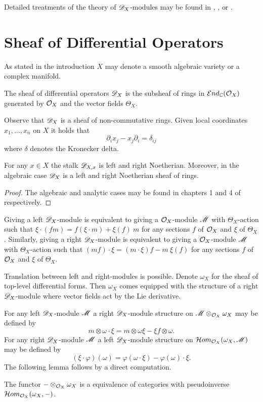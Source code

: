 Detailed treatments of the theory of $\mathscr{D}_X$-modules may be found in  \cite{bjork1979rings}, \cite{kashiwara2003d}, \cite{hotta2007d} or \cite{borel1987algebraic}.
\section{Sheaf of Differential Operators}
As stated in the introduction $X$ may denote a smooth algebraic variety or a complex manifold.
\begin{definition}
  The sheaf of differential operators $\mathscr{D}_X$ is the subsheaf of rings in $\mathcal{E}nd_{\mathbb{C}}(\mathcal{O}_X)$ generated by $\mathcal{O}_X$ and the vector fields $\Theta_X$.
\end{definition}
Observe that $\mathscr{D}_X$ is a sheaf of non-commutative rings.
Given local coordinates $x_1,\ldots, x_n$ on $X$ it holds that
$$\partial_i x_j - x_j\partial_i = \delta_{ij} $$
where $\delta$ denotes the Kronecker delta.
\begin{lemma}
  For any $x\in X$ the stalk $\mathscr{D}_{X,x}$ is left and right Noetherian. Moreover, in the algebraic case $\mathscr{D}_X$ is a left and right Noetherian sheaf of rings.
\end{lemma}
\begin{proof}
  The algebraic and analytic cases may be found in chapters 1 and 4 of \cite{hotta2007d} respectively.
\end{proof}
Giving a left $\mathscr{D}_X$-module is equivalent to giving a $\mathcal{O}_X$-module $\mathscr{M}$ with $\Theta_X$-action such that
$\xi\cdot (fm) = f (\xi \cdot m)  + \xi(f)\ m  $
for any sections $f$ of $\mathcal{O}_X$ and $\xi$ of $\Theta_X$. Similarly, giving a right $\mathscr{D}_X$-module is equivalent to giving a $\mathcal{O}_X$-module $\mathscr{M}$ with $\Theta_X$-action such that
$(mf)\cdot\xi = (m\cdot\xi)f - m\ \xi(f) $ for any sections $f$ of $\mathcal{O}_X$ and $\xi$ of $\Theta_X$.

Translation between left and right-modules is possible.
Denote $\omega_X$ for the sheaf of top-level differential forms.
Then $\omega_X$ comes equipped with the structure of a right $\mathscr{D}_X$-module where vector fields act by the Lie derivative.

For any left $\mathscr{D}_X$-module $\mathscr{M}$ a right $\mathscr{D}_X$-module structure on $\mathscr{M}\otimes_{\mathcal{O}_X}\omega_X$ may be defined by
$$m\otimes \omega \cdot \xi = m\otimes \omega\xi - \xi f \otimes \omega.$$
For any right $\mathscr{D}_X$-module $\mathscr{M}$ a left $\mathscr{D}_X$-module structure on $\mathcal{H}om_{\mathcal{O}_X}(\omega_X, \mathscr{M})$ may be defined by
$$(\xi\cdot \varphi)(\omega) = \varphi(\omega \cdot \xi) - \varphi(\omega)\cdot \xi. $$
The following lemma follows by a direct computation.
\begin{lemma}
  The functor ${-}\otimes_{\mathcal{O}_X}\omega_X$ is a equivalence of categories with pseudoinverse  $\mathcal{H}om_{\mathcal{O}_X}(\omega_X,{-})$.
\end{lemma}
